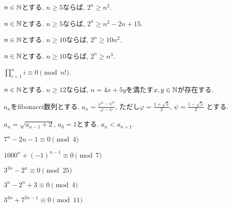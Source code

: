 \begin{prop}
$n\in\mathbb{N}$とする.
  $n\geq 5$ならば, $2^n\geq n^2$.
\end{prop}

\begin{prop}
$n\in\mathbb{N}$とする.
  $n\geq 5$ならば, $2^n\geq n^2-2n+15$.
\end{prop}


\begin{prop}
$n\in\mathbb{N}$とする.
  $n\geq 10$ならば, $2^n\geq 10n^2$.
\end{prop}

\begin{prop}
$n\in\mathbb{N}$とする.
  $n\geq 10$ならば, $2^n\geq n^3$.
\end{prop}

\begin{prop}
$\prod_{i=1}^n i \equiv 0 \pmod{n!}$.
\end{prop}



\begin{prop}
$n\in\mathbb{N}$とする.
  $n\geq 12$ならば, $n=4x+5y$を満たす$x,y\in\mathbb{N}$が存在する.
\end{prop}


\begin{prop}
  $a_n$をfibonacci数列とする.
  $a_n=\frac{\varphi^n-\psi^n}{\varphi-\psi}$,
  ただし$\varphi=\frac{1+\sqrt{5}}{2}$,
  $\psi=\frac{1-\sqrt{5}}{2}$
  とする.
\end{prop}

\begin{prop}
  $a_n=\sqrt{a_{n-1}+2}$, $a_0=1$とする.
  $a_n<a_{n+1}$.
\end{prop}


\begin{prop}
  $7^n-2n-1\equiv 0\pmod{4}$
\end{prop}

\begin{prop}
  $1000^n+(-1)^{n-1}\equiv 0\pmod{7}$
\end{prop}

\begin{prop}
  $3^{3n}-2^n\equiv 0\pmod{25}$
\end{prop}

\begin{prop}
  $3^{n}-2^n+3\equiv 0\pmod{4}$
\end{prop}

\begin{prop}
  $3^{3n}+7^{2n-1}\equiv 0\pmod{11}$
\end{prop}

